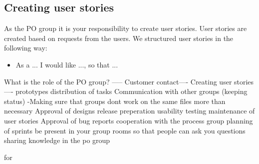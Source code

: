 \subsection{Creating user stories}
As the PO group it is your responsibility to create user stories.
User stories are created based on requests from the users.
We structured user stories in the following way:
\begin{itemize}
    \item As a ... I would like ..., so that ...
\end{itemize}



What is the role of the PO group? -----
Customer contact----
Creating user stories ----
prototypes
distribution of tasks
Communication with other groups (keeping status)
-Making sure that groups dont work on the same files more than necessary
Approval of designs
release preperation
usability testing
maintenance of user stories
Approval of bug reports
cooperation with the process group
planning of sprints
be present in your group rooms so that people can ask you questions
sharing knowledge in the po group




for






